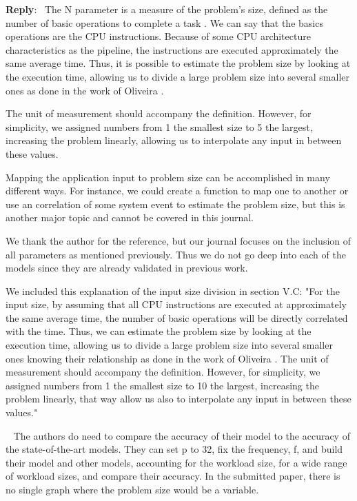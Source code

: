 \documentclass[11pt]{article}
\newcounter{reviewer}
\newcounter{point}[reviewer]
\newcounter{subpoint}[reviewer]
\newenvironment{subpoint}
   {\refstepcounter{subpoint} \bigskip \noindent {Point \textbf{\arabic{point}.\arabic{subpoint}} -- } \ }
   {\par }
\newenvironment{reply}
   {\medskip \noindent \begin{sf}\textbf{Reply}:\ }
   {\medskip \end{sf}}
\begin{document}
\begin{reply}
The N parameter is a measure of the problem's size, defined as the number of basic operations to complete a task \cite{Kumar1994AnalyzingArchitectures}. We can say that the basics operations are the CPU instructions. Because of some CPU architecture characteristics as the pipeline, the instructions are executed approximately the same average time. Thus, it is possible to estimate the problem size by looking at the execution time, allowing us to divide a large problem size into several smaller ones as done in the work of Oliveira \cite{Oliveira2018ApplicationCores}.

The unit of measurement should accompany the definition. However, for simplicity, we assigned numbers from 1 the smallest size to 5 the largest, increasing the problem linearly, allowing us to interpolate any input in between these values.

Mapping the application input to problem size can be accomplished in many different ways. For instance, we could create a function to map one to another or use an correlation of some system event to estimate the problem size, but this is another major topic and cannot be covered in this journal.

We thank the author for the reference, but our journal focuses on the inclusion of all parameters as mentioned previously. Thus we do not go deep into each of the models since they are already validated in previous work.

We included this explanation of the input size division in section V.C:
"For the input size, by assuming that all CPU instructions are executed at approximately the same average time, the number of basic operations will be directly correlated with the time. Thus, we can estimate the problem size by looking at the execution time, allowing us to divide a large problem size into several smaller ones knowing their relationship as done in the work of Oliveira \cite{Oliveira2018ApplicationCores}.
The unit of measurement should accompany the definition. However, for simplicity, we assigned numbers from 1 the smallest size to 10 the largest, increasing the problem linearly, that way allow us also to interpolate any input in between these values."
\end{reply}

\begin{subpoint}
The authors do need to compare the accuracy of their model to the accuracy of the state-of-the-art models. They can set p to 32, fix the frequency, f, and build their model and other models, accounting for the workload size, for a wide range of workload sizes, and compare their accuracy. In the submitted paper, there is no single graph where the problem size would be a variable.
\end{subpoint}
\end{document}
